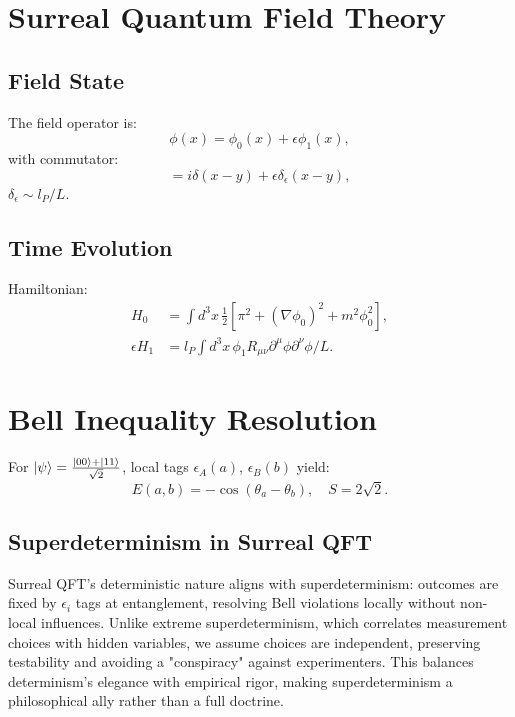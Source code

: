 \documentclass{article}
\begin{document}
\section{Surreal Quantum Field Theory}
\subsection{Field State}
The field operator is:
\begin{equation}
\phi(x) = \phi_0(x) + \epsilon \phi_1(x),
\end{equation}
with commutator:
\begin{equation}
[\phi(x), \pi(y)] = i \delta(x-y) + \epsilon \delta_\epsilon(x-y),
\end{equation}
\(\delta_\epsilon \sim l_P / L\).

\subsection{Time Evolution}
Hamiltonian:
\begin{align}
H_0 &= \int d^3x \, \frac{1}{2} [\pi^2 + (\nabla \phi_0)^2 + m^2 \phi_0^2], \\
\epsilon H_1 &= l_P \int d^3x \, \phi_1 R_{\mu\nu} \partial^\mu \phi \partial^\nu \phi / L.
\end{align}

\section{Bell Inequality Resolution}
For \(\ket{\psi} = \frac{\ket{00} + \ket{11}}{\sqrt{2}}\), local tags \(\epsilon_A(a)\), \(\epsilon_B(b)\) yield:
\begin{equation}
E(a,b) = -\cos(\theta_a - \theta_b), \quad S = 2\sqrt{2}.
\end{equation}

\subsection{Superdeterminism in Surreal QFT}
Surreal QFT’s deterministic nature aligns with superdeterminism: outcomes are fixed by \(\epsilon_i\) tags at entanglement, resolving Bell violations locally without non-local influences. Unlike extreme superdeterminism, which correlates measurement choices with hidden variables, we assume choices are independent, preserving testability and avoiding a "conspiracy" against experimenters. This balances determinism’s elegance with empirical rigor, making superdeterminism a philosophical ally rather than a full doctrine.
\end{document}
